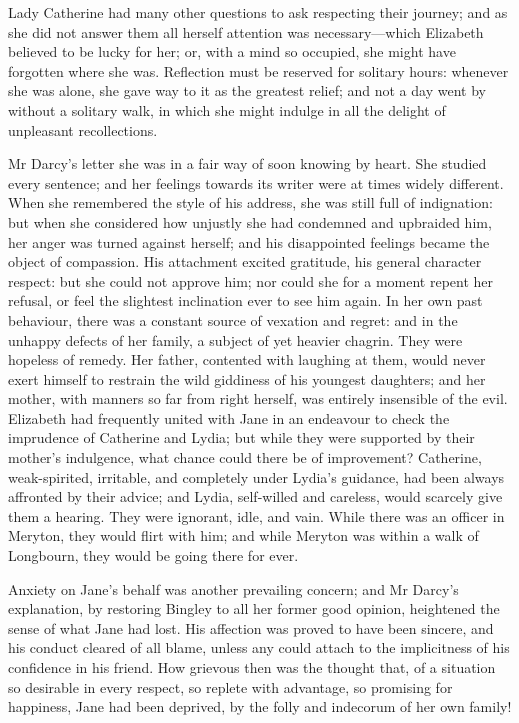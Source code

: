 Lady Catherine had many other questions to ask respecting their journey; and as she did not answer them all herself attention was necessary—which Elizabeth believed to be lucky for her; or, with a mind so occupied, she might have forgotten where she was. Reflection must be reserved for solitary hours: whenever she was alone, she gave way to it as the greatest relief; and not a day went by without a solitary walk, in which she might indulge in all the delight of unpleasant recollections.

Mr Darcy's letter she was in a fair way of soon knowing by heart. She studied every sentence; and her feelings towards its writer were at times widely different. When she remembered the style of his address, she was still full of indignation: but when she considered how unjustly she had condemned and upbraided him, her anger was turned against herself; and his disappointed feelings became the object of compassion. His attachment excited gratitude, his general character respect: but she could not approve him; nor could she for a moment repent her refusal, or feel the slightest inclination ever to see him again. In her own past behaviour, there was a constant source of vexation and regret: and in the unhappy defects of her family, a subject of yet heavier chagrin. They were hopeless of remedy. Her father, contented with laughing at them, would never exert himself to restrain the wild giddiness of his youngest daughters; and her mother, with manners so far from right herself, was entirely insensible of the evil. Elizabeth had frequently united with Jane in an endeavour to check the imprudence of Catherine and Lydia; but while they were supported by their mother's indulgence, what chance could there be of improvement? Catherine, weak-spirited, irritable, and completely under Lydia's guidance, had been always affronted by their advice; and Lydia, self-willed and careless, would scarcely give them a hearing. They were ignorant, idle, and vain. While there was an officer in Meryton, they would flirt with him; and while Meryton was within a walk of Longbourn, they would be going there for ever.

Anxiety on Jane's behalf was another prevailing concern; and Mr Darcy's explanation, by restoring Bingley to all her former good opinion, heightened the sense of what Jane had lost. His affection was proved to have been sincere, and his conduct cleared of all blame, unless any could attach to the implicitness of his confidence in his friend. How grievous then was the thought that, of a situation so desirable in every respect, so replete with advantage, so promising for happiness, Jane had been deprived, by the folly and indecorum of her own family!

